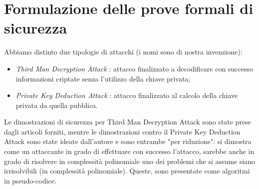 \documentclass[12pt, a4paper]{report}
\theoremstyle{definition}
\begin{document}
		\section{Formulazione delle prove formali di sicurezza}
			Abbiamo distinto due tipologie di attacchi (i nomi sono di nostra invenzione):
			\begin{itemize}
				\item \emph{Third Man Decryption Attack} : attacco finalizzato a decodificare con successo informazioni criptate senza l’utilizzo della chiave privata;
				\item \emph{Private Key Deduction Attack} : attacco finalizzato al calcolo della chiave privata da quella pubblica.
			\end{itemize}
			Le dimostrazioni di sicurezza per Third Man Decryption Attack sono state prese dagli articoli forniti, mentre le dimostrazioni contro il Private Key Deduction Attack sono state ideate dall'autore e sono entrambe "per riduzione": si dimostra come un attaccante in grado di effettuare con successo l'attacco, sarebbe anche in grado di risolvere in complessità polinomiale uno dei problemi che si assume siano irrisolvibili (in complessità polinomiale). Queste, sono presentate come algoritmi in pseudo-codice.
\end{document}
